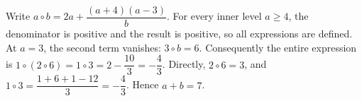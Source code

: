 Write $a\circ b=2a+\dfrac{(a+4)(a-3)}{b}$. For every inner level $a\ge4$, the denominator is positive and the result is positive, so all expressions are defined. At $a=3$, the second term vanishes: $3\circ b=6$. Consequently the entire expression is $1\circ(2\circ6)=1\circ3=2-\dfrac{10}{3}=-\dfrac{4}{3}$. Directly, $2\circ6=3$, and $1\circ3=\dfrac{1+6+1-12}{3}=-\dfrac{4}{3}$. Hence $a+b=\boxed7$.
